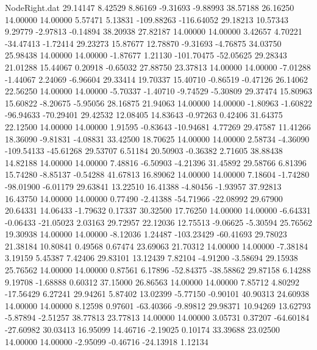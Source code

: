 \begin{filecontents}{NodeRight.dat}
  29.14147    8.42529    8.86169    -9.31693   -9.88993   38.57188   26.16250   14.00000   14.00000    5.57471    5.13831 -109.88263 -116.64052
  29.18213   10.57343    9.29779    -2.97813   -0.14894   38.20938   27.82187   14.00000   14.00000    3.42657    4.70221  -34.47413   -1.72414
  29.23273   15.87677   12.78870    -9.31693   -4.76875   34.03750   25.98438   14.00000   14.00000   -1.87677    1.21130 -101.70475  -52.05625
  29.28343   21.01288   15.44067     0.20918   -0.65032   27.88750   23.37813   14.00000   14.00000   -7.01288   -1.44067    2.24069   -6.96604
  29.33414   19.70337   15.40710    -0.86519   -0.47126   26.14062   22.56250   14.00000   14.00000   -5.70337   -1.40710   -9.74529   -5.30809
  29.37474   15.80963   15.60822    -8.20675   -5.95056   28.16875   21.94063   14.00000   14.00000   -1.80963   -1.60822  -96.94633  -70.29401
  29.42532   12.08405   14.83643    -0.97263    0.42406   31.64375   22.12500   14.00000   14.00000    1.91595   -0.83643  -10.94681    4.77269
  29.47587   11.41266   18.36090    -9.81831   -4.08831   33.42500   18.70625   14.00000   14.00000    2.58734   -4.36090 -109.54133  -45.61268
  29.53707    6.51184   20.50903    -0.36382    2.71605   38.88438   14.82188   14.00000   14.00000    7.48816   -6.50903   -4.21396   31.45892
  29.58766    6.81396   15.74280    -8.85137   -0.54288   41.67813   16.89062   14.00000   14.00000    7.18604   -1.74280  -98.01900   -6.01179
  29.63841   13.22510   16.41388    -4.80456   -1.93957   37.92813   16.43750   14.00000   14.00000    0.77490   -2.41388  -54.71966  -22.08992
  29.67900   20.64331   14.06433    -1.79632    0.17337   30.32500   17.76250   14.00000   14.00000   -6.64331   -0.06433  -21.05023    2.03163
  29.72957   22.12036   12.75513    -9.06625   -5.30594   25.76562   19.30938   14.00000   14.00000   -8.12036    1.24487 -103.23429  -60.41693
  29.78023   21.38184   10.80841     0.49568    0.67474   23.69063   21.70312   14.00000   14.00000   -7.38184    3.19159    5.45387    7.42406
  29.83101   13.12439    7.82104    -4.91200   -3.58694   29.15938   25.76562   14.00000   14.00000    0.87561    6.17896  -52.84375  -38.58862
  29.87158    6.14288    9.19708    -1.68888    0.60312   37.15000   26.86563   14.00000   14.00000    7.85712    4.80292  -17.56429    6.27241
  29.94261    5.87402   13.02399    -5.77150   -0.90101   40.90313   24.60938   14.00000   14.00000    8.12598    0.97601  -63.40366   -9.89812
  29.98371   10.94269   13.62793    -5.87894   -2.51257   38.77813   23.77813   14.00000   14.00000    3.05731    0.37207  -64.60184  -27.60982
  30.03413   16.95099   14.46716    -2.19025    0.10174   33.39688   23.02500   14.00000   14.00000   -2.95099   -0.46716  -24.13918    1.12134

\end{filecontents}
